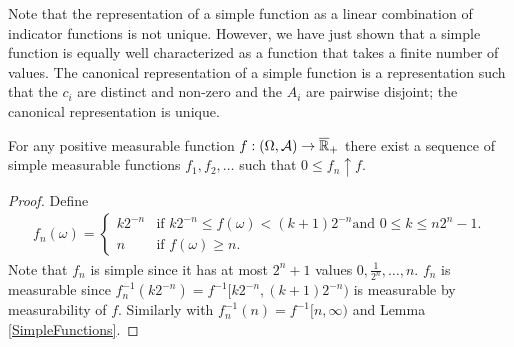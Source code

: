 Note that the representation of a simple function as a linear
combination of indicator functions is not unique.  However, we
have
just shown that a simple function is equally well characterized as a
function that takes a finite number of values.  The canonical
representation of a simple function is a representation such that the
$c_i$ are distinct and non-zero and the $A_i$ are pairwise disjoint; the canonical
representation is unique.
\begin{lem}\label{PointwiseApproximationBySimple}For any positive measurable function $f : (\Omega,
  \mathcal{A}) \to \overline{\mathbb{R}}_+$ there exist a sequence of simple measurable
  functions $f_1, f_2, \dots$ such that $0 \leq f_n \uparrow f$.
\end{lem}
\begin{proof}
Define
\begin{align*}
f_n(\omega) = 
\begin{cases}k2^{-n} & \text{if $k2^{-n} \leq f(\omega) < (k+1)2^{-n}$
    and $0 \leq k \leq n2^n -1$.} \\
n & \text{if $f(\omega) \geq n$.}
\end{cases}
\end{align*}
Note that $f_n$ is simple since it has at most $2^n + 1$ values $0,
\frac{1}{2^n}, \dots, n$.  $f_n$ is measurable since
$f_n^{-1}(k2^{-n}) = f^{-1}[k2^{-n},(k+1)2^{-n})$ is measurable by measurability of $f$.  Similarly
with $f_n^{-1}(n) = f^{-1} [n,\infty)$ and Lemma \ref{SimpleFunctions}.
\end{proof}

